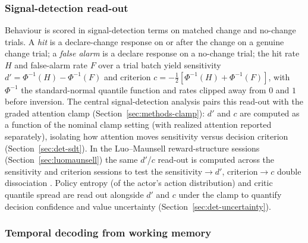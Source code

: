 \subsubsection{Signal-detection read-out}
\label{sec:methods-sdt}

Behaviour is scored in signal-detection terms on matched change and
no-change trials. A \emph{hit} is a declare-change response on or after the
change on a genuine change trial; a \emph{false alarm} is a declare
response on a no-change trial; the hit rate $H$ and false-alarm rate
$F$ over a trial batch yield sensitivity $d' = \Phi^{-1}(H) -
\Phi^{-1}(F)$ and criterion $c = -\tfrac12[\Phi^{-1}(H) + \Phi^{-1}(F)]$,
with $\Phi^{-1}$ the standard-normal quantile function and rates clipped
away from $0$ and $1$ before inversion. The central signal-detection
analysis pairs this read-out with the graded attention clamp
(Section~\ref{sec:methods-clamp}): $d'$ and $c$ are computed as a function
of the nominal clamp setting (with realized attention reported separately), isolating how attention
moves sensitivity versus decision criterion
(Section~\ref{sec:det-sdt}). In the Luo--Maunsell reward-structure
sessions (Section~\ref{sec:luomaunsell}) the same $d'$/$c$ read-out is
computed across the sensitivity and criterion sessions to test the
sensitivity$\to d'$, criterion$\to c$ double dissociation
\cite{luo_maunsell2018_criterion_sensitivity}. Policy entropy (of the
actor's action distribution) and critic quantile spread are read out
alongside $d'$ and $c$ under the clamp to quantify decision confidence and
value uncertainty (Section~\ref{sec:det-uncertainty}).

\subsubsection{Temporal decoding from working memory}
\label{sec:methods-decoding}

